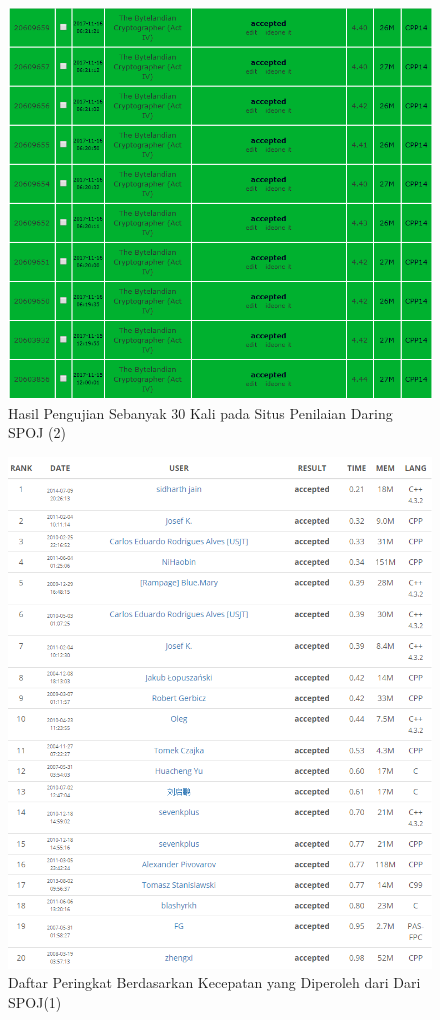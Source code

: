   \begin{figure}[H]
  \centering
  	\includegraphics[scale=0.5]{images/lampiran/uji3.png}
  	\caption{Hasil Pengujian Sebanyak 30 Kali pada Situs Penilaian Daring SPOJ (2)}
  	\label{fig:submission2}
  \end{figure}
  
  \begin{figure}[H]
  \centering
  	\includegraphics[scale=0.55]{images/lampiran/rankdiatas1.png}
  	\caption{Daftar Peringkat Berdasarkan Kecepatan yang Diperoleh dari Dari SPOJ(1)}
  	\label{fig:per1}
  \end{figure}
  

